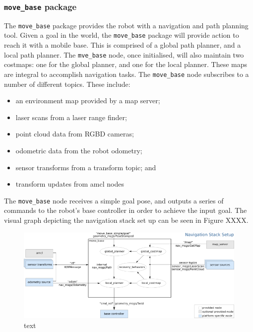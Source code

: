 \documentclass[a4paper]{article}
\begin{document}
\subsubsection{\texttt{move\_base} package}
The \texttt{move\_base} package provides the robot with a navigation and path planning tool. Given a goal in the world, the \texttt{move\_base} package will provide action to reach it with a mobile base. This is comprised of a global path planner, and a local path planner. The \texttt{mve\_base} node, once initialised, will also maintain two costmaps: one for the global planner, and one for the local planner. These maps are integral to accomplish navigation tasks. The \texttt{move\_base} node subscribes to a number of different topics. These include:
\begin{itemize}
\item an environment map provided by a map server;
\item laser scans from a laser range finder;
\item point cloud data from RGBD cameras;
\item odometric data from the robot odometry;
\item sensor transforms from a transform topic; and
\item transform updates from amcl nodes
\end{itemize}

The \texttt{move\_base} node receives a simple goal pose, and outputs a series of commands to the robot's base controller in order to achieve the input goal. The visual graph depicting the navigation stack set up can be seen in Figure XXXX.
\begin{figure}[h]
\centering
\includegraphics[scale=0.7]{move_base}
\caption{text}
\end{figure}
\end{document}
